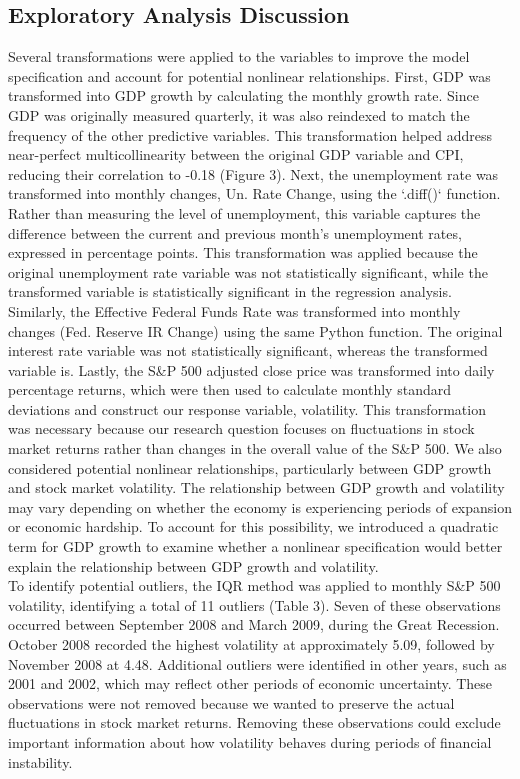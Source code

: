\subsection{Exploratory Analysis Discussion}
\indent 
Several transformations were applied to the variables to improve the model specification and account for potential nonlinear relationships. First, GDP was transformed into GDP growth by calculating the monthly growth rate. Since GDP was originally measured quarterly, it was also reindexed to match the frequency of the other predictive variables. This transformation helped address near-perfect multicollinearity between the original GDP variable and CPI, reducing their correlation to -0.18 (Figure 3). Next, the unemployment rate was transformed into monthly changes, Un. Rate Change, using the `.diff()` function. Rather than measuring the level of unemployment, this variable captures the difference between the current and previous month's unemployment rates, expressed in percentage points. This transformation was applied because the original unemployment rate variable was not statistically significant, while the transformed variable is statistically significant in the regression analysis. Similarly, the Effective Federal Funds Rate was transformed into monthly changes (Fed. Reserve IR Change) using the same Python function. The original interest rate variable was not statistically significant, whereas the transformed variable is. Lastly, the S\&P 500 adjusted close price was transformed into daily percentage returns, which were then used to calculate monthly standard deviations and construct our response variable, volatility. This transformation was necessary because our research question focuses on fluctuations in stock market returns rather than changes in the overall value of the S\&P 500. We also considered potential nonlinear relationships, particularly between GDP growth and stock market volatility. The relationship between GDP growth and volatility may vary depending on whether the economy is experiencing periods of expansion or economic hardship. To account for this possibility, we introduced a quadratic term for GDP growth to examine whether a nonlinear specification would better explain the relationship between GDP growth and volatility. \\
\indent To identify potential outliers, the IQR method was applied to monthly S\&P 500 volatility, identifying a total of 11 outliers (Table 3). Seven of these observations occurred between September 2008 and March 2009, during the Great Recession. October 2008 recorded the highest volatility at approximately 5.09, followed by November 2008 at 4.48. Additional outliers were identified in other years, such as 2001 and 2002, which may reflect other periods of economic uncertainty. These observations were not removed because we wanted to preserve the actual fluctuations in stock market returns. Removing these observations could exclude important information about how volatility behaves during periods of financial instability. \\
